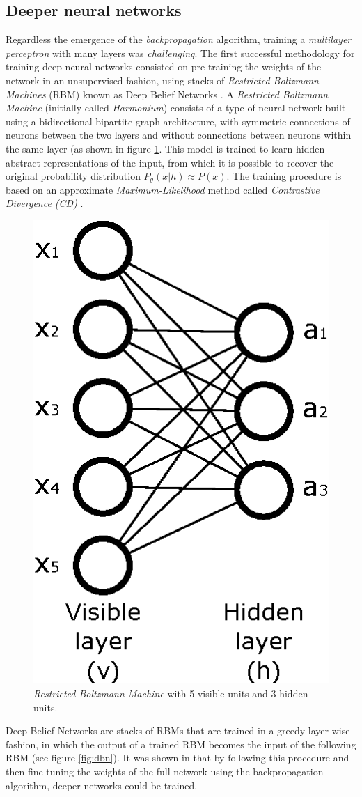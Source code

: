\subsection{Deeper neural networks}
Regardless the emergence of the \textit{backpropagation} algorithm, training a \textit{multilayer perceptron} with many layers was \textit{challenging}. The first successful methodology for training deep neural networks consisted on pre-training the weights of the network in an unsupervised fashion, using stacks of \textit{Restricted Boltzmann Machines} (RBM) \cite{Smolensky1986} known as Deep Belief Networks \cite{hinton2006, Bengio2007}. A \textit{Restricted Boltzmann Machine} (initially called \textit{Harmonium}) consists of a type of neural network built using a bidirectional bipartite graph architecture, with symmetric connections of neurons between the two layers and without connections between neurons within the same layer (as shown in figure \ref{fig:rbm}. This model is trained to learn hidden abstract representations of the input, from which it is possible to recover the original probability distribution $P_\theta(x|h) \approx P(x)$. The training procedure is based on an approximate \textit{Maximum-Likelihood} method called \textit{Contrastive Divergence (CD)} \cite{hinton2002}.

\begin{figure}
	\centering
	\includegraphics[width=0.2\linewidth]{chapter2/images/rbm}
	\caption{\textit{Restricted Boltzmann Machine} with 5 visible units and 3 hidden units.}
	\label{fig:rbm}
\end{figure}

Deep Belief Networks are stacks of RBMs that are trained in a greedy layer-wise fashion, in which the output of a trained RBM becomes the input of the following RBM \cite{hinton2006} (see figure \ref{fig:dbn}). It was shown in \cite{Bengio2007} that by following this procedure and then fine-tuning the weights of the full network using the backpropagation algorithm, deeper networks could be trained. 


